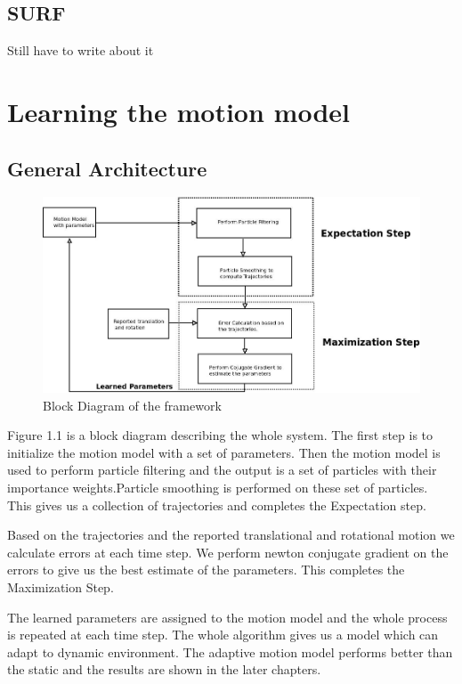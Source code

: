 \documentclass[12pt]{dalcsthesis}
\begin{document}
\section{SURF}
Still have to write about it

\chapter{Learning the motion model}
\section{General Architecture}


\begin{figure}[hbtp]
\caption{Block Diagram of the framework}
\centering
\includegraphics[scale=0.5]{Diagram1.jpeg}
\end{figure}



Figure 1.1 is a block diagram describing the whole system. The
first step is to initialize the motion model with a set of parameters.
Then the motion model is used to perform particle filtering and the output is a set of particles with their importance weights.Particle smoothing is performed on these set of particles. This gives us a collection
of trajectories and completes the Expectation step. 

Based on the trajectories and the reported translational and rotational
motion we calculate errors at each time step. We perform newton conjugate
gradient on the errors to give us the best estimate of the parameters.
This completes the Maximization Step.

The learned parameters are assigned to the motion model and the whole
process is repeated at each time step. The whole algorithm gives us
a model which can adapt to dynamic environment. The adaptive motion
model performs better than the static and the results are shown in
the later chapters.
\end{document}
